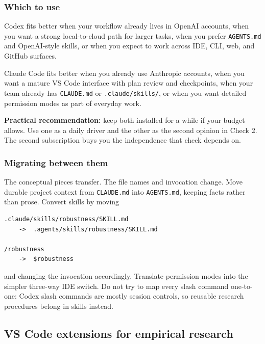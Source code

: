 \documentclass[11pt,a4paper]{article}
\newcommand{\code}[1]{\texttt{\small #1}}
\begin{document}
\subsubsection{Which to use}

Codex fits better when your workflow already lives in OpenAI accounts, when you
want a strong local-to-cloud path for larger tasks, when you prefer
\code{AGENTS.md} and OpenAI-style skills, or when you expect to work across IDE,
CLI, web, and GitHub surfaces.

Claude Code fits better when you already use Anthropic accounts, when you want a
mature VS Code interface with plan review and checkpoints, when your team already
has \code{CLAUDE.md} or \code{.claude/skills/}, or when you want detailed
permission modes as part of everyday work.

\textbf{Practical recommendation:} keep both installed for a while if your budget
allows. Use one as a daily driver and the other as the second opinion in Check 2.
The second subscription buys you the independence that check depends on.

\subsubsection{Migrating between them}

The conceptual pieces transfer. The file names and invocation change. Move durable
project context from \code{CLAUDE.md} into \code{AGENTS.md}, keeping facts rather
than prose. Convert skills by moving

\begin{promptbox}
\begin{Verbatim}[breaklines,fontsize=\small]
.claude/skills/robustness/SKILL.md
    ->  .agents/skills/robustness/SKILL.md

/robustness
    ->  $robustness
\end{Verbatim}
\end{promptbox}

\noindent and changing the invocation accordingly. Translate permission modes into the
simpler three-way IDE switch. Do not try to map every slash command one-to-one:
Codex slash commands are mostly session controls, so reusable research procedures
belong in skills instead.

\subsection{VS Code extensions for empirical research}
\end{document}
